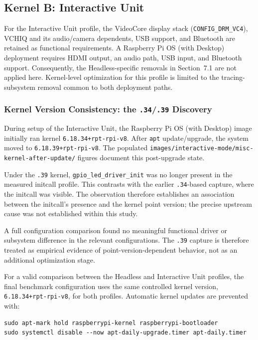 \documentclass[11pt,a4paper]{article}
\begin{document}
\subsection{Kernel B: Interactive Unit}

For the Interactive Unit profile, the VideoCore display stack (\texttt{CONFIG\_DRM\_VC4}), VCHIQ and its audio/camera dependents, USB support, and Bluetooth are retained as functional requirements. A Raspberry Pi OS (with Desktop) deployment requires HDMI output, an audio path, USB input, and Bluetooth support. Consequently, the Headless-specific removals in Section~7.1 are not applied here. Kernel-level optimization for this profile is limited to the tracing-subsystem removal common to both deployment paths.

\subsubsection*{Kernel Version Consistency: the \texttt{.34}/\texttt{.39} Discovery}

During setup of the Interactive Unit, the Raspberry Pi OS (with Desktop) image initially ran kernel \texttt{6.18.34+rpt-rpi-v8}. After \texttt{apt} update/upgrade, the system moved to \texttt{6.18.39+rpt-rpi-v8}. The populated \texttt{images/interactive-mode/misc-kernel-after-update/} figures document this post-upgrade state.

Under the \texttt{.39} kernel, \texttt{gpio\_led\_driver\_init} was no longer present in the measured initcall profile. This contrasts with the earlier \texttt{.34}-based capture, where the initcall was visible. The observation therefore establishes an association between the initcall's presence and the kernel point version; the precise upstream cause was not established within this study.

A full configuration comparison found no meaningful functional driver or subsystem difference in the relevant configurations. The \texttt{.39} capture is therefore treated as empirical evidence of point-version-dependent behavior, not as an additional optimization stage.

For a valid comparison between the Headless and Interactive Unit profiles, the final benchmark configuration uses the same controlled kernel version, \texttt{6.18.34+rpt-rpi-v8}, for both profiles. Automatic kernel updates are prevented with:

\begin{lstlisting}
sudo apt-mark hold raspberrypi-kernel raspberrypi-bootloader
sudo systemctl disable --now apt-daily-upgrade.timer apt-daily.timer
\end{lstlisting}
\end{document}
